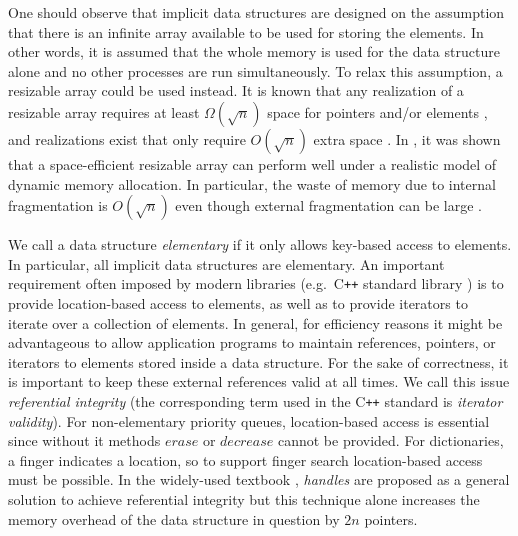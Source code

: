 \documentclass{DIKU-article}
\newcommand{\Erase}{\mbox{$\mathit{erase}$}}
\newcommand{\Decrease}{\mbox{$\mathit{decrease}$}}
\begin{document}
One should observe that implicit data structures are
designed on the assumption that there is an infinite array available
to be used for storing the elements. In other words, it is assumed
that the whole memory is used for the data structure alone and no
other processes are run simultaneously. To relax this assumption,
a resizable array could be used instead.  It is known that any
realization of a resizable array requires at least $\Omega(\sqrt{n})$
space for pointers and/or elements \cite{BCDMS99}, and realizations
exist that only require $O(\sqrt{n})$ extra space \cite{BCDMS99,KM01}.
In \cite{BCDMS99}, it was shown that a space-efficient resizable array
can perform well under a realistic model of dynamic memory
allocation. In particular, the waste of memory due to internal
fragmentation is $O(\sqrt{n})$ even though external
fragmentation can be large \cite{LL85}.

We call a data structure \emph{elementary} if it only allows
key-based access to elements. In particular, all
implicit data structures are elementary.  An important requirement often
imposed by modern libraries (e.g.~C\texttt{++} standard library
\cite{ISO}) is to provide location-based access to elements, as well as
to provide iterators to iterate over a collection of elements. In
general, for efficiency reasons it might be advantageous to allow
application programs to maintain references, pointers, or iterators to
elements stored inside a data structure. For the sake of correctness,
it is important to keep these external references valid at all times. We call
this issue \emph{referential integrity} (the corresponding term used
in the C\texttt{++} standard \cite{ISO} is \emph{iterator validity}).
For non-elementary priority queues,
location-based access is essential since without it methods \Erase{}
or \Decrease{} cannot be provided. For 
dictionaries, a finger indicates a location, so to
support finger search location-based access must be possible.  In the
widely-used textbook
\cite{CLRS01}, \emph{handles} are proposed as a general solution to
achieve referential integrity but this technique 
alone increases the memory overhead of the data structure in
question by $2n$ pointers.
\end{document}
